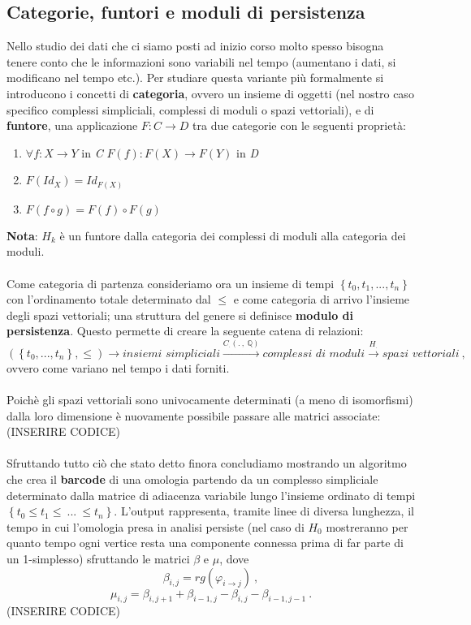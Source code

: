 \documentclass{article}
\begin{document}
\subsection{Categorie, funtori e moduli di persistenza}
Nello studio dei dati che ci siamo posti ad inizio corso molto spesso bisogna tenere conto che le informazioni sono variabili nel tempo (aumentano i dati, si modificano nel tempo etc.). Per studiare questa variante più formalmente si introducono i concetti di \textbf{categoria}, ovvero un insieme di oggetti (nel nostro caso specifico complessi simpliciali, complessi di moduli o spazi vettoriali), e di \textbf{funtore}, una applicazione \(F:C\rightarrow D\) tra due categorie con le seguenti proprietà:
\begin{enumerate}
\item \(\forall f:X\rightarrow Y\) in \textit{C} \(F(f):F(X)\rightarrow F(Y)\) in \textit{D}
\item \(F(Id_X)=Id_{F(X)}\)
\item \(F(f\circ g)=F(f)\circ F(g)\)
\end{enumerate}
\textbf{Nota}: \(H_k\) è un funtore dalla categoria dei complessi di moduli alla categoria dei moduli.\\ \\ Come categoria di partenza consideriamo ora un insieme di tempi \(\left\{t_0,t_1,...,t_n\right\}\) con l'ordinamento totale determinato dal \(\le\) e come categoria di arrivo l'insieme degli spazi vettoriali; una struttura del genere si definisce \textbf{modulo di persistenza}. Questo permette di creare la seguente catena di relazioni:
\[(\left\{t_0,...,t_n\right\},\le)\rightarrow \textit{insiemi simpliciali}\xrightarrow{C_.(.\ ,\ \mathbb{Q})} \textit{complessi di moduli}\xrightarrow{H_.}\textit{spazi vettoriali}\ ,\]
ovvero come variano nel tempo i dati forniti.\\ \\
Poichè gli spazi vettoriali sono univocamente determinati (a meno di isomorfismi) dalla loro dimensione è nuovamente possibile passare alle matrici associate: (INSERIRE CODICE)\\ \\
Sfruttando tutto ciò che stato detto finora concludiamo mostrando un algoritmo che crea il \textbf{barcode} di una omologia partendo da un complesso simpliciale determinato dalla matrice di adiacenza variabile lungo l'insieme ordinato di tempi \(\left\{t_0\le t_1\le \ ...\ \le t_n\right\}\). L'output rappresenta, tramite linee di diversa lunghezza, il tempo in cui l'omologia presa in analisi persiste (nel caso di \(H_0\) mostreranno per quanto tempo ogni vertice resta una componente connessa prima di far parte di un 1-simplesso) sfruttando le matrici \(\beta\) e \(\mu\), dove \[\beta_{i,j}=rg(\varphi_{i\rightarrow j})\ ,\] \[\mu_{i,j}=\beta_{i,j+1}+\beta_{i-1,j}-\beta_{i,j}-\beta_{i-1,j-1}\ .\](INSERIRE CODICE) 
\end{document}
